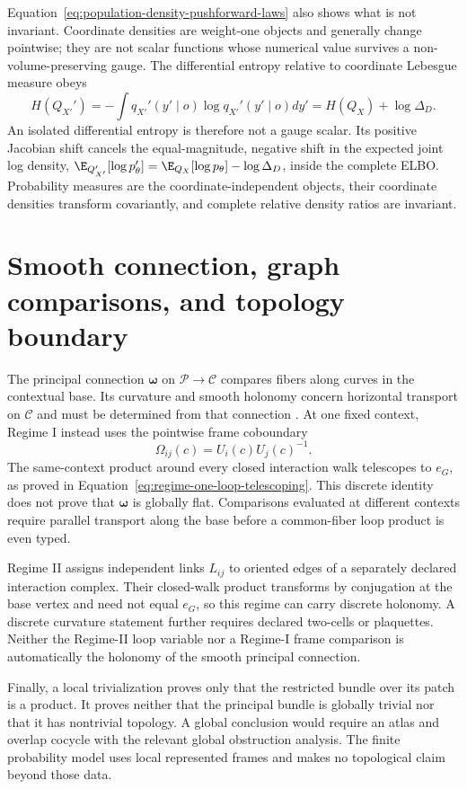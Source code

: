 Equation~\eqref{eq:population-density-pushforward-laws} also shows what is not invariant. Coordinate densities are weight-one objects and generally change pointwise; they are not scalar functions whose numerical value survives a non-volume-preserving gauge. The differential entropy relative to coordinate Lebesgue measure obeys
\begin{equation}
H(Q_{X'}')
=-\int q_{X'}'(y'\mid o)\log q_{X'}'(y'\mid o)dy'
=H(Q_X)+\log\Delta_D.
\label{eq:differential-entropy-gauge-shift}
\end{equation}
An isolated differential entropy is therefore not a gauge scalar. Its positive Jacobian shift cancels the equal-magnitude, negative shift in the expected joint log density, \(\E_{Q_{X'}'}[\log p_\theta']=\E_{Q_X}[\log p_\theta]-\log\Delta_D\), inside the complete ELBO. Probability measures are the coordinate-independent objects, their coordinate densities transform covariantly, and complete relative density ratios are invariant.

\section{Smooth connection, graph comparisons, and topology boundary}

The principal connection \(\boldsymbol\omega\) on \(\mathcal P\to\mathcal C\) compares fibers along curves in the contextual base. Its curvature and smooth holonomy concern horizontal transport on \(\mathcal C\) and must be determined from that connection \citep{Kobayashi1963,Nakahara2003}. At one fixed context, Regime I instead uses the pointwise frame coboundary
\begin{equation}
\Omega_{ij}(c)=U_i(c)U_j(c)^{-1}.
\label{eq:information-geometry-regime-one-coboundary}
\end{equation}
The same-context product around every closed interaction walk telescopes to \(e_G\), as proved in Equation~\eqref{eq:regime-one-loop-telescoping}. This discrete identity does not prove that \(\boldsymbol\omega\) is globally flat. Comparisons evaluated at different contexts require parallel transport along the base before a common-fiber loop product is even typed.

Regime II assigns independent links \(L_{ij}\) to oriented edges of a separately declared interaction complex. Their closed-walk product transforms by conjugation at the base vertex and need not equal \(e_G\), so this regime can carry discrete holonomy. A discrete curvature statement further requires declared two-cells or plaquettes. Neither the Regime-II loop variable nor a Regime-I frame comparison is automatically the holonomy of the smooth principal connection.

Finally, a local trivialization proves only that the restricted bundle over its patch is a product. It proves neither that the principal bundle is globally trivial nor that it has nontrivial topology. A global conclusion would require an atlas and overlap cocycle with the relevant global obstruction analysis. The finite probability model uses local represented frames and makes no topological claim beyond those data.
